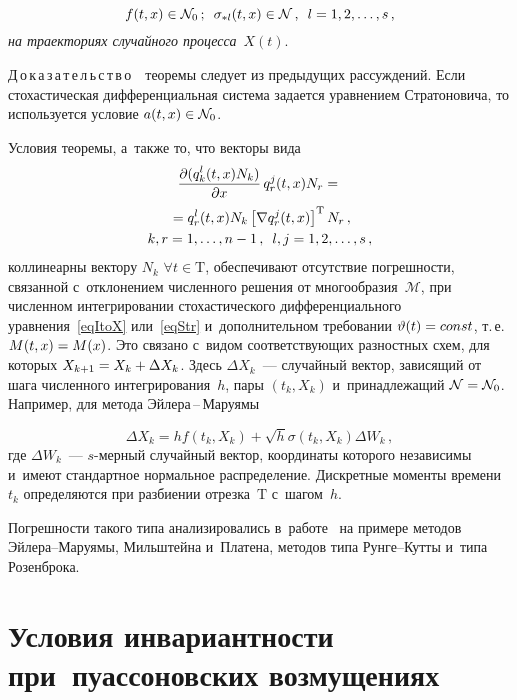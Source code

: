 \begin{multicols}{2}
\pagebreak

\noindent
$$
  f(t,x) \in \mathcal{N}_0\,; \enskip \sigma_{* l}(t,x) \in \mathcal{N}\,,\enskip
   l = 1,2,\dots,s\,,
$$
\textit{на траекториях случайного процесса}~$X(t)$.

\smallskip

\noindent
Д\,о\,к\,а\,з\,а\,т\,е\,л\,ь\,с\,т\,в\,о\ \ теоремы следует из предыдущих рассуждений. 
Если стохастическая дифференциальная система задается уравнением 
Стратоновича, то используется условие $a(t,x) \hm\in \mathcal{N}_0$.

Условия теоремы, а~также то, что векторы вида
\begin{multline*}
  \displaystyle\frac{\displaystyle \partial (q_k^l(t,x) N_k)\mathstrut}{\displaystyle \partial x\mathstrut} \, q_r^j(t,x) N_r = {}\\
  {}=
  q_r^l(t,x)  N_k  \left[ \nabla q_r^j(t,x) \right]^{{\mathrm{T}}}  N_r\,,
\\
  k,r = 1,\ldots,n-1\,, \enskip l,j = 1,2,\ldots,s\,,
\end{multline*}
коллинеарны вектору $N_k$ $\forall t \in \mathrm{T}$, 
обеспечивают отсутствие погрешности, связанной с~отклонением 
численного решения от многообразия~$\mathcal{M}$, при чис\-лен\-ном интегрировании 
стохастического дифференциального уравнения~\eqref{eqItoX} или~\eqref{eqStr} 
и~дополнительном требовании $\vartheta(t) \hm= {const}$, т.\,е.\
 $M(t,x) \hm= M(x)$. Это связано с~видом соответствующих разностных схем, 
 для которых $X_{k+1} \hm= X_k \hm+ \Delta X_k$. Здесь $\Delta X_k$~--- 
 случайный вектор, зависящий от шага численного интегрирования~$h$, пары $(t_k,X_k)$ 
 и~принадлежащий $\mathcal{N} \hm= \mathcal{N}_0$. Например, для метода 
 Эй\-ле\-ра\,--\,Ма\-ру\-ямы
 {
 
 }
 
 \noindent
$$
  \Delta X_k = h  f(t_k,X_k) + \sqrt{h}  \sigma(t_k,X_k)  \Delta W_k\,,
$$
где $\Delta W_k$~--- $s$-мер\-ный случайный вектор, координаты 
которого независимы и~имеют стандартное нормальное распределение. 
Дискретные моменты времени~$t_k$ определяются при разбиении отрезка~$\mathrm{T}$ 
с~шагом~$h$. 

Погрешности такого типа анализировались в~работе~\cite{AveKarRyb_RJNAMM18} 
на примере методов Эй\-ле\-ра--Ма\-ру\-ямы, Мильштейна и~Платена, методов типа 
Рун\-ге--Кут\-ты и~типа Розенброка.



\section{Условия инвариантности при~пуассоновских возмущениях}


\end{multicols}
